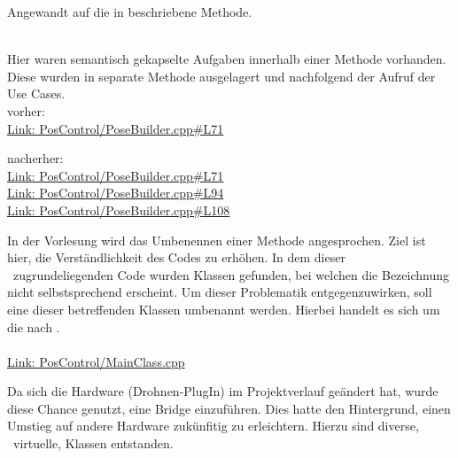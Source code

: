 Angewandt auf die in  beschriebene Methode.\\
\\
 

Hier waren semantisch gekapselte Aufgaben innerhalb einer Methode vorhanden. Diese wurden in separate Methode ausgelagert und nachfolgend der Aufruf der Use Cases.\\
vorher:\\
\href{https://github.com/MobMonRob/ROSLabDrohne/blob/ea7d3d0640e8cde5156c6604e2432fa71061914b/Code/PosControl/src/PoseBuilder.cpp\#L71}{Link: PosControl/PoseBuilder.cpp\#L71}

nacherher:\\
\href{https://github.com/MobMonRob/ROSLabDrohne/blob/9dd6821a9c63bf1682806b8ab319d6004247d3ca/Code/PosControl/src/PoseBuilder.cpp\#L71}{Link: PosControl/PoseBuilder.cpp\#L71}\\
\href{https://github.com/MobMonRob/ROSLabDrohne/blob/9dd6821a9c63bf1682806b8ab319d6004247d3ca/Code/PosControl/src/PoseBuilder.cpp\#L94}{Link: PosControl/PoseBuilder.cpp\#L94}\\
\href{https://github.com/MobMonRob/ROSLabDrohne/blob/9dd6821a9c63bf1682806b8ab319d6004247d3ca/Code/PosControl/src/PoseBuilder.cpp\#L108}{Link: PosControl/PoseBuilder.cpp\#L108}


In der Vorlesung wird das Umbenennen einer Methode angesprochen. Ziel ist hier, die Verständlichkeit des Codes zu erhöhen.
In dem dieser \Arbeit\ zugrundeliegenden Code wurden Klassen gefunden, bei welchen die Bezeichnung nicht selbstsprechend erscheint. Um dieser Problematik entgegenzuwirken, soll eine dieser betreffenden Klassen umbenannt werden. Hierbei handelt es sich um die  nach  .\\
\\
\href{https://github.com/MobMonRob/ROSLabDrohne/blob/3c5aeed610150bd19f75241af48a2777cb4c582a/Code/PosControl/src/MainClass.cpp}{Link: PosControl/MainClass.cpp}




Da sich die Hardware (Drohnen-PlugIn) im Projektverlauf geändert hat, wurde diese Chance genutzt, eine Bridge einzuführen. Dies hatte den Hintergrund, einen Umstieg auf andere Hardware zukünfitig zu erleichtern.
Hierzu sind diverse, \tw\ virtuelle\footnotemark[1], Klassen entstanden.
























